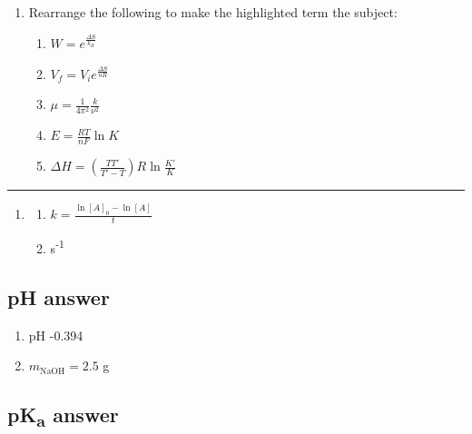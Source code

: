 \documentclass[
]{book}
\providecommand{\tightlist}{%
  \setlength{\itemsep}{0pt}\setlength{\parskip}{0pt}}
\begin{document}
\begin{enumerate}
\def\labelenumi{\arabic{enumi}.}
\tightlist
\item
  Rearrange the following to make the highlighted term the subject:

  \begin{enumerate}
  \def\labelenumii{\alph{enumii}.}
  \tightlist
  \item
    \(W = e^{\frac{\Delta S}{k_B}}\)
  \item
    \(V_f=V_i e^{\frac{\Delta S}{nR}}\)
    \\
  \item
    \(\mu=\frac{1}{4 \pi^2}\frac{k}{\nu^2}\)
    \\
  \item
    \(E=\frac{RT}{nF}\ln K\)
  \item
    \(\Delta H = \left(\frac{TT'}{T'-T}\right)R \ln \frac{K'}{K}\)
  \end{enumerate}
\end{enumerate}

\begin{center}\rule{0.5\linewidth}{0.5pt}\end{center}

\begin{enumerate}
\def\labelenumi{\arabic{enumi}.}
\setcounter{enumi}{1}
\item
  \begin{enumerate}
  \def\labelenumii{\alph{enumii}.}
  \tightlist
  \item
    \(k=\frac{\ln [A]_0-\ln [A]}{t}\)
  \item
    s\textsuperscript{-1}
  \end{enumerate}
\end{enumerate}

\hypertarget{subsec:pHans}{%
\subsection{pH answer}\label{subsec:pHans}}

\begin{enumerate}
\def\labelenumi{\alph{enumi}.}
\tightlist
\item
  pH -0.394
\item
  \(m_{\textrm{NaOH}}=2.5\) g
\end{enumerate}

\hypertarget{subsec:pKaans}{%
\subsection{\texorpdfstring{pK\textsubscript{a} answer}{pKa answer}}\label{subsec:pKaans}}
\end{document}

